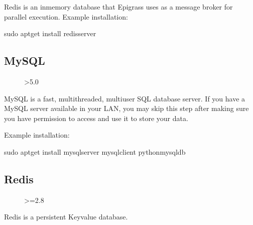 \documentclass[letterpaper,10pt,english]{sphinxmanual}
\begin{document}
Redis is an in\sphinxhyphen{}memory database that Epigrass uses as a message broker for parallel execution.
Example installation:

\begin{sphinxVerbatim}[commandchars=\\\{\}]
\PYGZdl{} sudo apt\PYGZhy{}get install redis\PYGZhy{}server
\end{sphinxVerbatim}


\subsection{MySQL}
\label{\detokenize{install:mysql}}\begin{description}
\item[{}] \leavevmode
{}

\item[{}] \leavevmode
\textgreater{}5.0

\end{description}

MySQL is a fast, multi\sphinxhyphen{}threaded, multi\sphinxhyphen{}user SQL database server. If you have a MySQL server available in your LAN, you may skip this step after making sure you have permission to access and use it to store your data.

Example installation:

\begin{sphinxVerbatim}[commandchars=\\\{\}]
\PYGZdl{} sudo apt\PYGZhy{}get install mysql\PYGZhy{}server mysql\PYGZhy{}client python\PYGZhy{}mysqldb
\end{sphinxVerbatim}


\subsection{Redis}
\label{\detokenize{install:redis}}\begin{description}
\item[{}] \leavevmode
{}

\item[{}] \leavevmode
\textgreater{}=2.8

\end{description}

Redis is a persistent Key\sphinxhyphen{}value database.
\end{document}
